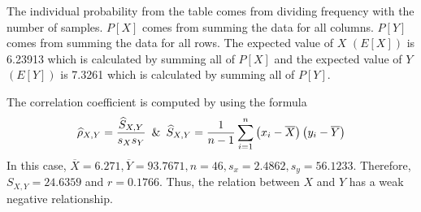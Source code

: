 The individual probability from the table comes from dividing frequency with the number of samples. $P[X]$ comes from summing the data for all columns. $P[Y]$ comes from summing the data for all rows. The expected value of $X$ $(E[X])$ is 6.23913 which is calculated by summing all of $P[X]$ and the expected value of $Y$ $(E[Y])$ is 7.3261 which is calculated by summing all of $P[Y]$.
\begin{figure}[h!]
\end{figure}\newpage
The correlation coefficient is computed by using the formula 
\begin{displaymath}
    \widehat{\rho}_{X, Y} = \dfrac{\widehat{S}_{X, Y}}{s_Xs_Y} \enskip \& \enskip \widehat{S}_{X, Y}=\dfrac{1}{n-1}\displaystyle\sum\limits^n_{i=1}\left(x_i-\overline{X}\right)\left(y_i-\overline{Y}\right)
\end{displaymath}
In this case, \(\overline{X} = 6.271, \overline{Y} = 93.7671, n = 46, s_x = 2.4862, s_y = 56.1233\). Therefore, \(S_{X, Y} = 24.6359\) and \(r = 0.1766\). Thus, the relation between $X$ and $Y$ has a weak negative relationship.\\
